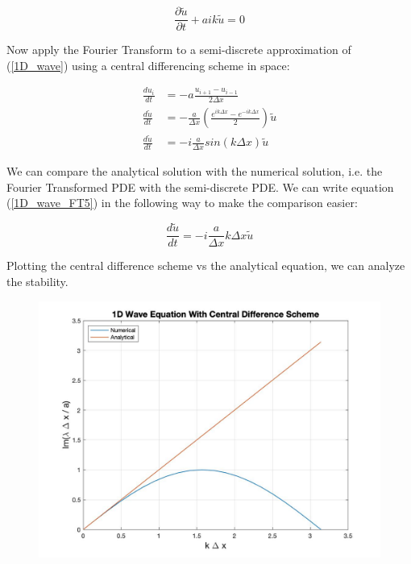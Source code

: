 \documentclass[10pt]{article}
\begin{document}
	\begin{equation} \label{1D_wave_FT5}
			\frac{\partial \tilde{u}}{\partial t} +aik \tilde{u} = 0
	\end{equation}
	
	Now apply the Fourier Transform to a semi-discrete approximation of (\ref{1D_wave}) using a central differencing scheme in space:
	
	\begin{equation} \label{1D_wave_semi}
		\begin{aligned}
			\frac{du_i}{dt} &= - a \frac{u_{i+1} - u_{i-1}}{2 \Delta x} \\
			\frac{d \tilde u}{dt} &= - \frac{a}{\Delta x} \left( \frac{e^{ik \Delta x} - e^{-ik \Delta x}}{2} \right) \tilde{u} \\
			\frac{d \tilde u}{dt} &= -i \frac{a}{\Delta x} sin(k \Delta x) \tilde{u}
		\end{aligned}
	\end{equation}
	
	We can compare the analytical solution with the numerical solution, i.e. the Fourier Transformed PDE with the semi-discrete PDE. We can write equation (\ref{1D_wave_FT5}) in the following way to make the comparison easier:
	
	\begin{equation} \label{1D_wave_FT6}
		\frac{d \tilde u}{dt} = -i \frac{a}{\Delta x} k \Delta x \tilde{u}
	\end{equation}
	
	Plotting the central difference scheme vs the analytical equation, we can analyze the stability.
	
	\begin{figure}[h]
		\includegraphics[width=12cm]{wave_central}
		\centering
	\end{figure}
\end{document}
